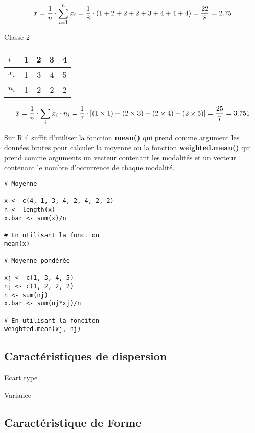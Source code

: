 \documentclass{report}
\begin{document}
\begin{align*}
  \Bar{x}=\frac{1}{n} \cdot \sum_{i=1}^n x_i = \frac{1}{8} \cdot (1+2+2+2+3+4+4+4) = \frac{22}{8} = 2.75
\end{align*}

Classe 2

\begin{center}
\begin{tabular}{l c c c c} 
\hline
$i$&1&2&3&4 \\ 
\hline
$x_i$&1&3&4&5 \\
$n_i$&1&2&2&2 \\
\hline
\end{tabular}
\end{center}
\quad


\begin{align*}
  \Bar{x}=\frac{1}{n} \cdot \sum_{i} x_i \cdot n_i =\frac{1}{7} \cdot [(1\times1)+(2\times3)+(2\times4)+(2\times5)] =\frac{25}{7} = 3.751
\end{align*}

Sur R il suffit d'utiliser la fonction \textbf{mean()} qui prend comme argument les données brutes pour calculer la moyenne ou la fonction \textbf{weighted.mean()} qui prend comme arguments un vecteur contenant les modalités et un vecteur contenant le nombre d'occurrence de chaque modalité.

\begin{verbatim}
# Moyenne 

x <- c(4, 1, 3, 4, 2, 4, 2, 2)
n <- length(x)
x.bar <- sum(x)/n

# En utilisant la fonction 
mean(x)

# Moyenne pondérée

xj <- c(1, 3, 4, 5)
nj <- c(1, 2, 2, 2)
n <- sum(nj)
x.bar <- sum(nj*xj)/n

# En utilisant la fonciton
weighted.mean(xj, nj)
\end{verbatim}

\subsection{Caractéristiques de dispersion}



Ecart type

Variance

\subsection{Caractéristique de Forme}
\end{document}
